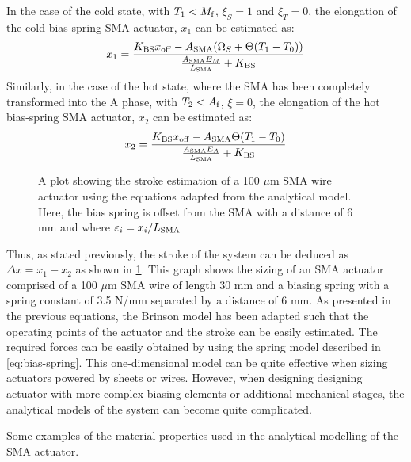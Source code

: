 In the case of the cold state, with $T_1 < M_\mathrm{f}$, $\xi_S=1$ and $\xi_T=0$, the elongation of the cold bias-spring SMA actuator, $x_1$ can be estimated as:
\begin{equation}
    \label{eq:bias-spring-sma-cold-elongation}
    x_1 = \frac{K_\mathrm{BS}x_\mathrm{off}-A_\mathrm{SMA}(\Omega_S+\Theta(T_1-T_0))}{\frac{A_\mathrm{SMA} E_M}{L_\mathrm{SMA}}+K_\mathrm{BS}}
\end{equation}
Similarly, in the case of the hot state, where the SMA has been completely transformed into the A phase, with $T_2 < A_\mathrm{f}$, $\xi=0$, the elongation of the hot bias-spring SMA actuator, $x_2$ can be estimated as:
\begin{equation}
    \label{eq:bias-spring-sma-hot-elongation}
    x_2 = \frac{K_\mathrm{BS}x_\mathrm{off}-A_\mathrm{SMA}\Theta(T_1-T_0)}{\frac{A_\mathrm{SMA} E_A}{L_\mathrm{SMA}}+K_\mathrm{BS}}
\end{equation}

\begin{figure}[hbt]
    \centering
    \resizebox{0.75\textwidth}{!}{}
    \caption{A plot showing the stroke estimation of a 100 $\mu$m SMA wire actuator using the equations adapted from the \cite{brinsonOneDimensionalConstitutiveBehavior1993} analytical model. Here, the bias spring is offset from the SMA with a distance of $6$ mm and where $\varepsilon_i = x_i / L_\mathrm{SMA}$ }
    \label{fig:brinson-sma-spring}
\end{figure}

Thus, as stated previously, the stroke of the system can be deduced as $\Delta x = x_1-x_2$ as shown in \cref{fig:brinson-sma-spring}. This graph shows the sizing of an SMA actuator comprised of a 100 $\mu$m SMA wire of length 30 mm and a biasing spring with a spring constant of 3.5 N/mm separated by a distance of 6 mm. As presented in the previous equations, the Brinson model has been adapted such that the operating points of the actuator and the stroke can be easily estimated. The required forces can be easily obtained by using the spring model described in \cref{eq:bias-spring}. This one-dimensional model can be quite effective when sizing actuators powered by sheets or wires. However, when designing designing actuator with more complex biasing elements or additional mechanical stages, the analytical models of the system can become quite complicated.

\begin{table}[hbt]
    \centering
    \caption{Some examples of the material properties used in the analytical modelling of the SMA actuator.}
    \label{tab:brinson-material-properties}
    
\end{table}
